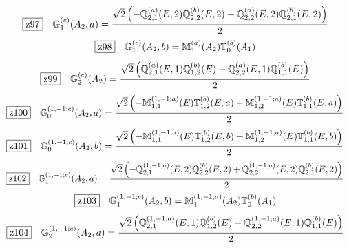 \documentclass[fleqn,10pt,landscape]{jsarticle}
\begin{document}
\begin{dmath*}
\hspace*{3mm}\fbox{z97}\quad \mathbb{G}_{1}^{(c)}(A_{2},a)=\frac{\sqrt{2} \left(- \mathbb{Q}_{2,1}^{(a)}(E,2) \mathbb{Q}_{2,2}^{(b)}(E,2) + \mathbb{Q}_{2,2}^{(a)}(E,2) \mathbb{Q}_{2,1}^{(b)}(E,2)\right)}{2}
\end{dmath*}
\begin{dmath*}
\hspace*{3mm}\fbox{z98}\quad \mathbb{G}_{1}^{(c)}(A_{2},b)=\mathbb{M}_{1}^{(a)}(A_{2}) \mathbb{T}_{0}^{(b)}(A_{1})
\end{dmath*}
\begin{dmath*}
\hspace*{3mm}\fbox{z99}\quad \mathbb{G}_{2}^{(c)}(A_{2})=\frac{\sqrt{2} \left(\mathbb{Q}_{2,1}^{(a)}(E,1) \mathbb{Q}_{1,2}^{(b)}(E) - \mathbb{Q}_{2,2}^{(a)}(E,1) \mathbb{Q}_{1,1}^{(b)}(E)\right)}{2}
\end{dmath*}
\begin{dmath*}
\hspace*{3mm}\fbox{z100}\quad \mathbb{G}_{0}^{(1,-1;c)}(A_{2},a)=\frac{\sqrt{2} \left(- \mathbb{M}_{1,1}^{(1,-1;a)}(E) \mathbb{T}_{1,2}^{(b)}(E,a) + \mathbb{M}_{1,2}^{(1,-1;a)}(E) \mathbb{T}_{1,1}^{(b)}(E,a)\right)}{2}
\end{dmath*}
\begin{dmath*}
\hspace*{3mm}\fbox{z101}\quad \mathbb{G}_{0}^{(1,-1;c)}(A_{2},b)=\frac{\sqrt{2} \left(- \mathbb{M}_{1,1}^{(1,-1;a)}(E) \mathbb{T}_{1,2}^{(b)}(E,b) + \mathbb{M}_{1,2}^{(1,-1;a)}(E) \mathbb{T}_{1,1}^{(b)}(E,b)\right)}{2}
\end{dmath*}
\begin{dmath*}
\hspace*{3mm}\fbox{z102}\quad \mathbb{G}_{1}^{(1,-1;c)}(A_{2},a)=\frac{\sqrt{2} \left(- \mathbb{Q}_{2,1}^{(1,-1;a)}(E,2) \mathbb{Q}_{2,2}^{(b)}(E,2) + \mathbb{Q}_{2,2}^{(1,-1;a)}(E,2) \mathbb{Q}_{2,1}^{(b)}(E,2)\right)}{2}
\end{dmath*}
\begin{dmath*}
\hspace*{3mm}\fbox{z103}\quad \mathbb{G}_{1}^{(1,-1;c)}(A_{2},b)=\mathbb{M}_{1}^{(1,-1;a)}(A_{2}) \mathbb{T}_{0}^{(b)}(A_{1})
\end{dmath*}
\begin{dmath*}
\hspace*{3mm}\fbox{z104}\quad \mathbb{G}_{2}^{(1,-1;c)}(A_{2},a)=\frac{\sqrt{2} \left(\mathbb{Q}_{2,1}^{(1,-1;a)}(E,1) \mathbb{Q}_{1,2}^{(b)}(E) - \mathbb{Q}_{2,2}^{(1,-1;a)}(E,1) \mathbb{Q}_{1,1}^{(b)}(E)\right)}{2}
\end{dmath*}
\end{document}
